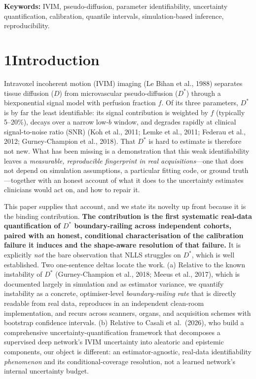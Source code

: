 \documentclass[11pt]{article}
\newcommand{\Dstar}{\ensuremath{D^{*}}}
\begin{document}
\vspace{0.4em}
\noindent\textbf{Keywords:} IVIM, pseudo-diffusion, parameter identifiability,
uncertainty quantification, calibration, quantile intervals, simulation-based inference,
reproducibility.

\section*{1\quad Introduction}

Intravoxel incoherent motion (IVIM) imaging (Le Bihan et al., 1988) separates tissue
diffusion ($D$) from microvascular pseudo-diffusion (\Dstar{}) through a biexponential
signal model with perfusion fraction $f$. Of its three parameters, \Dstar{} is by far
the least identifiable: its signal contribution is weighted by $f$ (typically 5--20\%),
decays over a narrow low-$b$ window, and degrades rapidly at clinical signal-to-noise
ratio (SNR) (Koh et al., 2011; Lemke et al., 2011; Federau et al., 2012;
Gurney-Champion et al., 2018). That \Dstar{} is hard to estimate is therefore not new.
What has been missing is a demonstration that this weak identifiability leaves a
\emph{measurable, reproducible fingerprint in real acquisitions}---one that does not
depend on simulation assumptions, a particular fitting code, or ground truth---together
with an honest account of what it does to the uncertainty estimates clinicians would
act on, and how to repair it.

This paper supplies that account, and we state its novelty up front because it is the
binding contribution. \textbf{The contribution is the first systematic real-data
quantification of \Dstar{} boundary-railing across independent cohorts, paired with an
honest, conditional characterisation of the calibration failure it induces and the
shape-aware resolution of that failure.} It is explicitly \emph{not} the bare
observation that NLLS struggles on \Dstar{}, which is well established. Two one-sentence
deltas locate the work. (a) Relative to the known instability of \Dstar{}
(Gurney-Champion et al., 2018; Meeus et al., 2017), which is documented largely in
simulation and as estimator variance, we quantify instability as a concrete,
optimiser-level \emph{boundary-railing rate} that is directly readable from real data,
reproduces in an independent clean-room implementation, and recurs across scanners,
organs, and acquisition schemes with bootstrap confidence intervals. (b) Relative to
Casali et al.\ (2026), who build a comprehensive uncertainty-quantification framework
that decomposes a supervised deep network's IVIM uncertainty into aleatoric and
epistemic components, our object is different: an estimator-agnostic, real-data
identifiability \emph{phenomenon} and its conditional-coverage resolution, not a learned
network's internal uncertainty budget.
\end{document}
